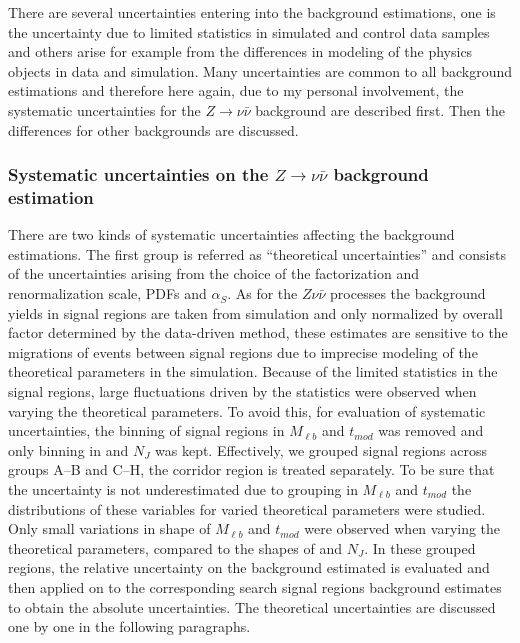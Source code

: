 There are several uncertainties entering into the background estimations, one is the uncertainty due to limited statistics in simulated and control data samples and others arise for example from the differences in modeling of the physics objects in data and simulation. Many uncertainties are common to all background estimations and therefore here again, due to my personal involvement, the systematic uncertainties for the $Z \to \nu \bar{\nu}$ background are described first. Then the differences for other backgrounds are discussed.

\subsubsection{Systematic uncertainties on the $Z \to \nu \bar{\nu}$ background estimation}

There are two kinds of systematic uncertainties affecting the background estimations. The first group is referred as ``theoretical uncertainties'' and consists of the uncertainties arising from the choice of the factorization and renormalization scale, PDFs and $\alpha_{S}$. As for the $Z \nu \bar{\nu}$ processes the background yields in signal regions are taken from simulation and only normalized by overall factor determined by the data-driven method, these estimates are sensitive to the migrations of events between signal regions due to imprecise modeling of the theoretical parameters in the simulation. Because of the limited statistics in the signal regions, large fluctuations driven by the statistics were observed when varying the theoretical parameters. To avoid this, for evaluation of systematic uncertainties, the binning of signal regions in $M_{\ell b}$ and $t_{mod}$ was removed and only binning in \MET and $N_{J}$ was kept. Effectively, we grouped signal regions across groups A--B and C--H, the corridor region is treated separately. To be sure that the uncertainty is not underestimated due to grouping in $M_{\ell b}$ and $t_{mod}$ the distributions of these variables for varied theoretical parameters were studied. Only small variations in shape of $M_{\ell b}$ and $t_{mod}$ were observed when varying the theoretical parameters, compared to the shapes of \MET and $N_{J}$. In these grouped regions, the relative uncertainty on the background estimated is evaluated and then applied on to the corresponding search signal regions background estimates to obtain the absolute uncertainties.  The theoretical uncertainties are discussed one by one in the following paragraphs.


